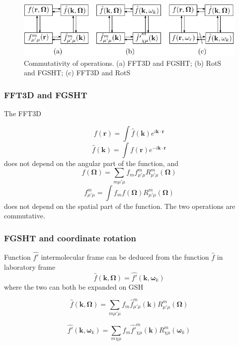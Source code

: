 \begin{figure}[h]
\begin{centering}
\includegraphics{_figure/algorithms_commutativity}
\par\end{centering}

\caption[Commutativity of operations]{Commutativity of operations. (a) FFT3D and FGSHT; (b) RotS and FGSHT;
(c) FFT3D and RotS\label{fig:Commutativity-of-operations}}
\end{figure}



\subsubsection{FFT3D and FGSHT}

The FFT3D

\[
f(\mathbf{r})=\int\hat{f}(\mathbf{k})e^{i\mathbf{k}\cdot\mathbf{r}}
\]
\[
\hat{f}(\mathbf{k})=\int f(\mathbf{r})e^{-i\mathbf{k}\cdot\mathbf{r}}
\]
does not depend on the angular part of the function, and
\[
f(\mathbf{\Omega})=\sum_{m\mu'\mu}f_{m}f_{\mu'\mu}^{m}R_{\mu'\mu}^{m}(\mathbf{\Omega})
\]
\[
f_{\mu'\mu}^{m}=\int f_{m}f(\mathbf{\Omega})R_{\mu'\mu}^{m}(\mathbf{\Omega})
\]
does not depend on the spatial part of the function. The two operations
are commutative.


\subsubsection{FGSHT and coordinate rotation}

Function $\hat{f'}$ intermolecular frame can be deduced from the
function $\hat{f}$ in laboratory frame 
\[
\hat{f}(\mathbf{k},\mathbf{\Omega})=\hat{f'}(\mathbf{k},\boldsymbol{\omega}_{k})
\]
where the two can both be expanded on GSH

\[
\hat{f}(\mathbf{k},\mathbf{\Omega})=\sum_{m\mu'\mu}f_{m}\hat{f}_{\mu'\mu}^{m}(\mathbf{k})R_{\mu'\mu}^{m}(\mathbf{\Omega})
\]


\[
\hat{f'}(\mathbf{k},\boldsymbol{\omega}_{k})=\sum_{m\chi\mu}f_{m}\hat{f'}_{\chi\mu}^{m}(\mathbf{k})R_{\chi\mu}^{m}(\boldsymbol{\omega}_{k})
\]


